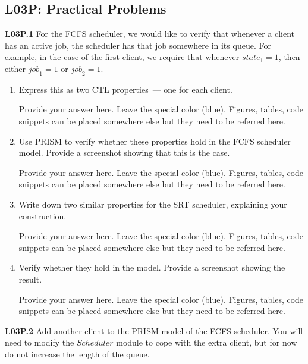\documentclass[12pt,a4paper]{article}
\newcommand{\prismident}[1]{\mathit{#1}}
\newcommand{\Pname}[1]{\prismident{#1}}
\begin{document}
\subsection*{L03P: Practical Problems}
\begin{description}
\item{\bf L03P.1} For the FCFS scheduler, we would like to verify that whenever a client has an active job, the scheduler has that job somewhere in
its queue. For example, in the case of the first client, we require that whenever $\Pname{state}_1 = 1$, then either $\Pname{job}_1 = 1$
or $\Pname{job}_2 = 1$.
\begin{enumerate}[label=\alph*)]
\item Express this as two CTL properties~--- one for each client.
%
\ifwithanswers
\color{blue}
\par
Provide your answer here. Leave the special color (blue). Figures, tables, code snippets can be placed somewhere else but they need to be referred here.
\color{black}
\fi
%
\item Use PRISM to verify whether these properties hold in the FCFS scheduler model. Provide a screenshot showing that this is the case.
%
\ifwithanswers
\color{blue}
\par
Provide your answer here. Leave the special color (blue). Figures, tables, code snippets can be placed somewhere else but they need to be referred here.
\color{black}
\fi
%
\item Write down two similar properties for the SRT scheduler, explaining your construction.
%
\ifwithanswers
\color{blue}
\par
Provide your answer here. Leave the special color (blue). Figures, tables, code snippets can be placed somewhere else but they need to be referred here.
\color{black}
\fi
%
\item Verify whether they hold in the model. Provide a screenshot showing the result.
%
\ifwithanswers
\color{blue}
\par
Provide your answer here. Leave the special color (blue). Figures, tables, code snippets can be placed somewhere else but they need to be referred here.
\color{black}
\fi
%
\end{enumerate}
\item{\bf L03P.2} Add another client to the PRISM model of the FCFS scheduler. You will need to modify the $\Pname{Scheduler}$ module to cope
with the extra client, but for now do not increase the length of the queue. 
\begin{enumerate}[label=\alph*)]

\end{enumerate}
\end{description}
\end{document}
